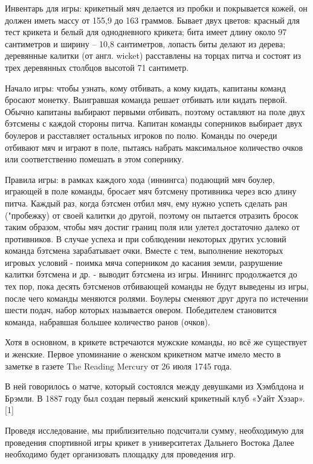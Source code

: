 Инвентарь для игры: крикетный мяч делается из пробки и покрывается кожей, он должен иметь массу от 155,9 до 163 граммов. Бывает двух цветов: красный для тест крикета и белый для однодневного крикета; бита имеет длину около 97 сантиметров и ширину – 10,8 сантиметров, лопасть биты делают из дерева; деревянные калитки (от англ. wicket) расставлены на торцах питча и состоят из трех деревянных столбцов высотой 71 сантиметр.

Начало игры: чтобы узнать, кому отбивать, а кому кидать, капитаны команд бросают монетку. Выигравшая команда решает отбивать или кидать первой. Обычно капитаны выбирают первыми отбивать, поэтому оставляют на поле двух бэтсмены с каждой стороны питча. Капитан команды соперников выбирает двух боулеров и расставляет остальных игроков по полю. Команды по очереди отбивают мяч и играют в поле, пытаясь набрать максимальное количество очков или соответственно помешать в этом сопернику.

Правила игры: в рамках каждого хода (иннингса) подающий мяч боулер, играющей в поле команды, бросает мяч бэтсмену противника через всю длину питча. Каждый раз, когда бэтсмен отбил мяч, ему нужно успеть сделать ран ("пробежку) от своей калитки до другой, поэтому он пытается отразить бросок таким образом, чтобы мяч достиг границ поля или улетел достаточно далеко от противников. В случае успеха и при соблюдении некоторых других условий команда бэтсмена зарабатывает очки. Вместе с тем, выполнение некоторых игровых условий - поимка мяча соперником до касания земли, разрушение калитки бэтсмена и др. - выводит бэтсмена из игры. Иннингс продолжается до тех пор, пока десять бэтсменов отбивающей команды не будут выведены из игры, после чего команды меняются ролями. Боулеры сменяют друг друга по истечении шести подач, набор которых называется овером. Победителем становится команда, набравшая большее количество ранов (очков).

Хотя в основном, в крикете встречаются мужские команды, но всё же существует и женские. Первое упоминание о женском крикетном матче имело место в заметке в газете The Reading Mercury от 26 июля 1745 года.

В ней говорилось о матче, который состоялся между девушками из Хэмблдона и Брэмли. В 1887 году был создан первый женский крикетный клуб «Уайт Хэзар». [1]

Проведя исследование, мы приблизительно подсчитали сумму, необходимую для проведения спортивной игры крикет в университетах Дальнего Востока  Далее необходимо будет организовать площадку для проведения игр.

